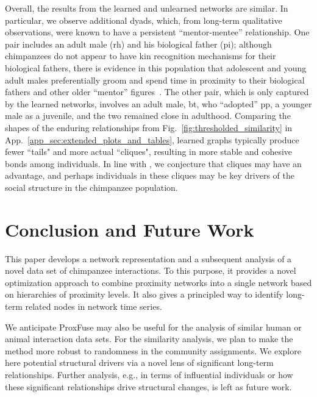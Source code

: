 \documentclass{article}
\theoremstyle{plain}
\theoremstyle{definition}
\theoremstyle{remark}
\begin{document}
Overall, the results from the learned and unlearned networks are similar. In particular, we observe additional dyads, which, from long-term qualitative observations, were known to have a persistent “mentor-mentee” relationship. One pair includes an adult male (rh) and his biological father (pi); although chimpanzees do not appear to have kin recognition mechanisms for their biological fathers, there is evidence in this population that adolescent and young adult males preferentially groom and spend time in proximity to their biological fathers and other older “mentor” figures~\cite{sandel2020adolescent}. The other pair, which is only captured by the learned networks, involves an adult male, bt, who “adopted” pp, a younger male as a juvenile, and the two remained close in adulthood. Comparing the shapes of the enduring relationships from Fig.~\ref{fig:thresholded_similarity} in App.~\ref{app_sec:extended_plots_and_tables}, learned graphs typically produce fewer ``tails" and more actual ``cliques", resulting in more stable and cohesive bonds among individuals. In line with \citet{SexualSegregationCliquesandSocialPowerinSquirrelMonkeySaimiriGroups}, we conjecture that cliques may have an advantage, and perhaps individuals in these cliques may be key drivers of the social structure in the chimpanzee population.
\section{Conclusion and Future Work}
\label{sec:conclusion}
This paper develops a network representation and a subsequent analysis of a novel data set of chimpanzee interactions. To this purpose, it provides a novel optimization approach to combine proximity networks into a single network based on hierarchies of proximity levels. It also gives a principled way to identify long-term related nodes in network time series. 

We anticipate ProxFuse may also be useful for the analysis of similar human or animal interaction data sets.  For the similarity analysis, we plan to make the method more robust to randomness in the community assignments. We explore here potential structural drivers via a novel lens of significant long-term relationships. Further analysis, e.g., in terms of influential individuals or how these significant relationships drive structural changes, is left as future work. 
\end{document}
